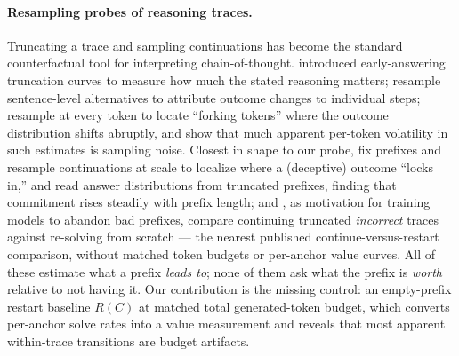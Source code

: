 
\paragraph{Resampling probes of reasoning traces.}
Truncating a trace and sampling continuations has become the standard
counterfactual tool for interpreting chain-of-thought. \citet{lanham2023}
introduced early-answering truncation curves to measure how much the stated
reasoning matters; \citet{bogdan2025anchors}
resample sentence-level alternatives to attribute outcome changes to
individual steps; \citet{bigelow2025forking} resample at every token to
locate ``forking tokens'' where the outcome distribution shifts abruptly,
and \citet{bigelow2026forkingfast} show that much apparent per-token
volatility in such estimates is sampling noise. Closest in shape to our
probe, \citet{merrill2026ponr} fix prefixes and resample continuations at
scale to localize where a (deceptive) outcome ``locks in,'' and
\citet{ballon2026} read answer distributions from truncated prefixes,
finding that commitment rises steadily with prefix length; and
\citet{wang2026re2}, as motivation for training models to abandon bad
prefixes, compare continuing truncated \emph{incorrect} traces against
re-solving from scratch --- the nearest published continue-versus-restart
comparison, without matched token budgets or per-anchor value curves. All
of
these estimate what a prefix \emph{leads to}; none of them ask what the
prefix is \emph{worth} relative to not having it. Our contribution is the
missing control: an empty-prefix restart baseline $R(C)$ at matched total
generated-token budget, which converts per-anchor solve rates into a value measurement and
reveals that most apparent within-trace transitions are budget artifacts.

